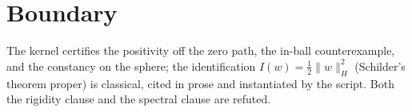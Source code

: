 \documentclass[11pt]{article}
\begin{document}
\section{Boundary}

The kernel certifies the positivity off the zero path, the in-ball
counterexample, and the constancy on the sphere; the identification
$I(w) = \tfrac12\|w\|_H^2$ (Schilder's theorem proper) is classical,
cited in prose and instantiated by the script.  Both the rigidity
clause and the spectral clause are refuted.
\end{document}
